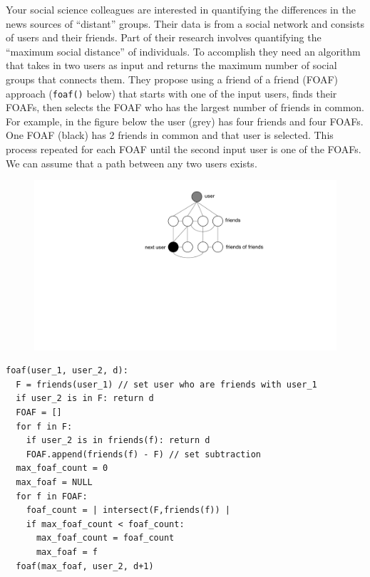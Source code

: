 \documentclass[12pt]{article}
\begin{document}
\renewcommand{\headrulewidth}{0.5pt}

\phantom{Test}
Your social science colleagues are interested in quantifying the differences in
the news sources of ``distant'' groups. Their data is from a social network and
consists of users and their friends. Part of their research involves
quantifying the ``maximum social distance'' of individuals. To accomplish they
need an algorithm that takes in two users as input and returns the maximum
number of social groups that connects them. They propose using a friend of a
friend (FOAF) approach ({\tt foaf()} below) that starts with one of the input
users, finds their FOAFs, then selects the FOAF who has the largest number of
friends in common. For example, in the figure below the user (grey) has four
friends and four FOAFs. One FOAF (black) has 2 friends in common and that user
is selected.  This process repeated for each FOAF until the second input user
is one of the FOAFs. We can assume that a path between any two users exists.
\begin{figure}[h!]
\begin{center}
\includegraphics[scale=0.5]{EIB6_graph.pdf}
\end{center}
\end{figure}
\begin{small}
\begin{verbatim}
foaf(user_1, user_2, d):
  F = friends(user_1) // set user who are friends with user_1
  if user_2 is in F: return d
  FOAF = []
  for f in F:
    if user_2 is in friends(f): return d
    FOAF.append(friends(f) - F) // set subtraction
  max_foaf_count = 0
  max_foaf = NULL
  for f in FOAF:
    foaf_count = | intersect(F,friends(f)) |
    if max_foaf_count < foaf_count:
      max_foaf_count = foaf_count
      max_foaf = f
  foaf(max_foaf, user_2, d+1)
\end{verbatim}
\end{small}
\end{document}
